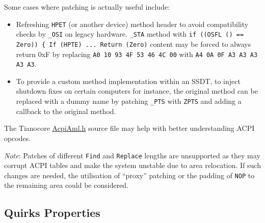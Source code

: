 \documentclass[]{article}
\begin{document}
Some cases where patching is actually useful include:

\begin{itemize}
\item
  Refreshing \texttt{HPET} (or another device) method header to avoid
  compatibility checks by \texttt{\_OSI} on legacy hardware. \texttt{\_STA}
  method with \texttt{if ((OSFL () == Zero)) \{ If (HPTE)  ...  Return (Zero)}
  content may be forced to always return 0xF by replacing
  \texttt{A0 10 93 4F 53 46 4C 00} with \texttt{A4 0A 0F A3 A3 A3 A3 A3}.
\item
  To provide a custom method implementation within an SSDT, to inject
  shutdown fixes on certain computers for instance, the original method can
  be replaced with a dummy name by patching \texttt{\_PTS} with \texttt{ZPTS}
  and adding a callback to the original method.
\end{itemize}

The Tianocore \href{https://github.com/acidanthera/audk/blob/master/MdePkg/Include/IndustryStandard/AcpiAml.h}{AcpiAml.h} source file may help with better understanding ACPI opcodes.

\emph{Note}: Patches of different \texttt{Find} and \texttt{Replace} lengths
are unsupported as they may corrupt ACPI tables and make the system unstable
due to area relocation. If such changes are needed, the utilisation of ``proxy''
patching or the padding of \texttt{NOP} to the remaining area could be considered.

\subsection{Quirks Properties}\label{acpipropsquirks}
\end{document}
